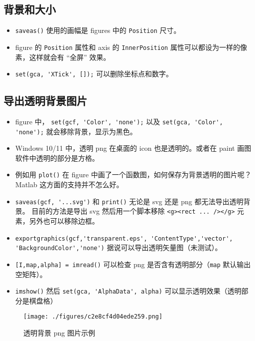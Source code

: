 
\subsection{背景和大小}
\begin{itemize}
\item \verb`saveas()` 使用的画幅是 figures 中的 \verb`Position` 尺寸。
\item figure 的 \verb`Position` 属性和 axis 的 \verb`InnerPosition` 属性可以都设为一样的像素，这样就会有 “全屏” 效果。
\item \verb`set(gca, 'XTick', []);` 可以删除坐标点和数字。
\end{itemize}

\subsection{导出透明背景图片}
\begin{itemize}
\item figure 中， \verb`set(gcf, 'Color', 'none');` 以及 \verb`set(gca, 'Color', 'none');` 就会移除背景，显示为黑色。
\item Windows 10/11 中，透明 png 在桌面的 icon 也是透明的。或者在 paint 画图软件中透明的部分是方格。
\item 例如用 \verb`plot()` 在 figure 中画了一个函数图，如何保存为背景透明的图片呢？ Matlab 这方面的支持并不怎么好。
\item \verb`saveas(gcf, '...svg')` 和 \verb`print()` 无论是 svg 还是 png 都无法导出透明背景。 目前的方法是导出 svg 然后用一个脚本移除 \verb`<g><rect ... /></g>` 元素，另外也可以移除边框。
\item \verb`exportgraphics(gcf,'transparent.eps', 'ContentType','vector', 'BackgroundColor','none')` 据说可以导出透明矢量图（未测试）。
\item \verb`[I,map,alpha] = imread()` 可以检查 png 是否含有透明部分（\verb`map` 默认输出空矩阵）。
\item \verb`imshow()` 然后 \verb`set(gca, 'AlphaData', alpha)` 可以显示透明效果（透明部分是棋盘格）
\end{itemize}

\begin{figure}[ht]
\centering
\texttt{[image: ./figures/c2e8cf4d04ede259.png]}
\caption{透明背景 png 图片示例} \label{fig_SciMov_1}
\end{figure}
